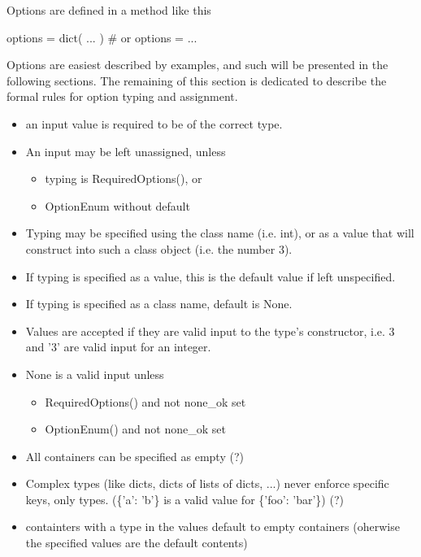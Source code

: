 Options are defined in a method like this

\begin{python}
  options = dict( ... )  # or
  options = { ... }
\end{python}

Options are easiest described by examples, and such will be presented
in the following sections.  The remaining of this section is dedicated
to describe the formal rules for option typing and assignment.

 \begin{itemize}
 \item an input value is required to be of the correct type.

 \item An input may be left unassigned, unless
   \begin{itemize}
   \item typing is RequiredOptions(), or
   \item OptionEnum without default
   \end{itemize}
   
 \item Typing may be specified using the class name (i.e. int), or as
   a value that will construct into such a class object (i.e. the
   number 3).

 \item If typing is specified as a value, this is the default value if
   left unspecified.

 \item If typing is specified as a class name, default is None.

 \item Values are accepted if they are valid input to the type's
   constructor, i.e. 3 and '3' are valid input for an integer.

 \item None is a valid input unless
   \begin{itemize}
   \item RequiredOptions() and not none\_ok set
   \item OptionEnum() and not none\_ok set
   \end{itemize}

 \item All containers can be specified as empty (?)

 \item Complex types (like dicts, dicts of lists of dicts, ...) never
   enforce specific keys, only types. (\{'a': 'b'\} is a valid value
   for \{'foo': 'bar'\}) (?)
   
 \item containters with a type in the values default to empty
   containers (oherwise the specified values are the default contents)

\end{itemize}


